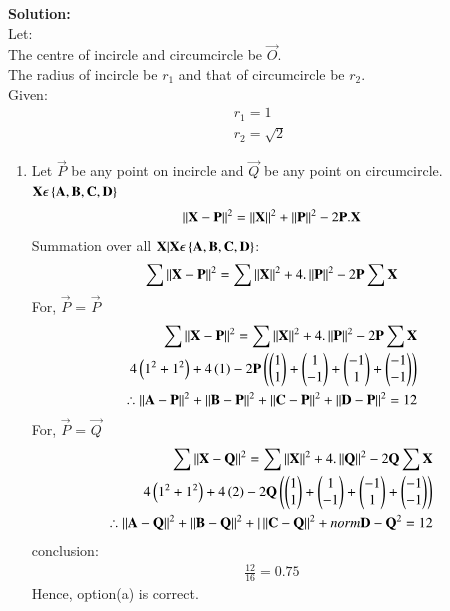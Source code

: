 \documentclass[journal]{IEEEtran}
\begin{document}
\textbf{Solution: }\\
Let:\\
The centre of incircle and circumcircle be $\vec{O}$.\\
The radius of incircle be $r_1$ and that of circumcircle be $r_2$.\\
Given:
\begin{align}
    r_1 = 1\\
    r_2 = \sqrt{2}
\end{align}
\begin{enumerate}
\item Let $\vec{P}$ be any point on incircle and $\vec{Q}$ be any point on circumcircle.\\
$\mathbf{X}\epsilon \left\{\mathbf{A,B,C,D}\right\}$
\begin{align}
    \left\lVert\mathbf{X}-\mathbf{P}\right\rVert^2 = \left\lVert\mathbf{X}\right\rVert^2 + \left\lVert\mathbf{P}\right\rVert^2 - 2\mathbf{P}.\mathbf{X}\\
\end{align}
Summation over all $\mathbf{X}|\mathbf{X}\epsilon \left\{\mathbf{A,B,C,D}\right\}$:
\begin{align}
    \sum \left\lVert\mathbf{X}-\mathbf{P}\right\rVert^2 = \sum \left\lVert\mathbf{X}\right\rVert^2 + 4.\left\lVert\mathbf{P}\right\rVert^2 -2\mathbf{P}\sum \mathbf{X}\\
\end{align}
For, $\vec{P}$ = $\vec{P}$
\begin{align}
    \sum \left\lVert\mathbf{X}-\mathbf{P}\right\rVert^2 = \sum \left\lVert\mathbf{X}\right\rVert^2 + 4.\left\lVert\mathbf{P}\right\rVert^2 -2\mathbf{P}\sum \mathbf{X}\\
    4\left(1^2+1^2\right) + 4\left(1\right)-2\mathbf{P}\left(\begin{pmatrix}1\\1\end{pmatrix}+\begin{pmatrix}1\\-1\end{pmatrix}+\begin{pmatrix}-1\\1\end{pmatrix}+\begin{pmatrix}-1\\-1\end{pmatrix}\right)\\
    \therefore \left\lVert\mathbf{A}-\mathbf{P}\right\rVert^2+\left\lVert\mathbf{B}-\mathbf{P}\right\rVert^2+\left\lVert\mathbf{C}-\mathbf{P}\right\rVert^2+\left\lVert\mathbf{D}-\mathbf{P}\right\rVert^2 = 12
\end{align}
For, $\vec{P}$ = $\vec{Q}$
\begin{align}
    \sum \left\lVert\mathbf{X}-\mathbf{Q}\right\rVert^2 = \sum \left\lVert\mathbf{X}\right\rVert^2 + 4.\left\lVert\mathbf{Q}\right\rVert^2 -2\mathbf{Q}\sum \mathbf{X}\\
    4\left(1^2+1^2\right) + 4\left(2\right)-2\mathbf{Q}\left(\begin{pmatrix}1\\1\end{pmatrix}+\begin{pmatrix}1\\-1\end{pmatrix}+\begin{pmatrix}-1\\1\end{pmatrix}+\begin{pmatrix}-1\\-1\end{pmatrix}\right)\\
    \therefore \left\lVert\mathbf{A}-\mathbf{Q}\right\rVert^2+\left\lVert\mathbf{B}-\mathbf{Q}\right\rVert^2+|\left\lVert\mathbf{C}-\mathbf{Q}\right\rVert^2+norm{\mathbf{D}-\mathbf{Q}}^2 = 12
\end{align}
conclusion:
\begin{align}
    \frac{12}{16}=0.75
\end{align}
Hence, option(a) is correct.


\end{enumerate}
\end{document}
